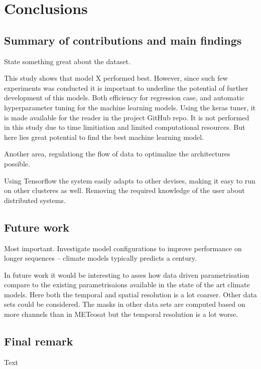 \chapter{Conclusions}

\section{Summary of contributions and main findings }
State something great about the dataset.

This study shows that model X performed best. However, since such few experiments was conducted it is important to underline the potential of further development of this models. Both efficiency for regression case, and automatic hyperparameter tuning for the machine learning models. Using the keras tuner, it is made available for the reader in the project GitHub repo. It is not performed in this study due to time limitiation and limited computational resources. But here lies great potential to find the best machine learning model. 

Another area, regulationg the flow of data to optimalize the architectures possible.

Using Tensorflow the system easily adapts to other devises, making it easy to run on other clusteres as well. Removing the required knowledge of the user about distributed systems. 



\section{Future work}

Most important. Investigate model configurations to improve performance on longer sequences -- climate models typically predicts a century.

In future work it would be interesting to asses how data driven parametrisation compare to the existing parametrisaions available in the state of the art climate models. Here both the temporal and spatial resolution is a lot coarser. Other data sets could be considered. The masks in other data sets are computed based on more channels than in METeosat but the temporal resolution is a lot worse. 



\section{Final remark}
Text